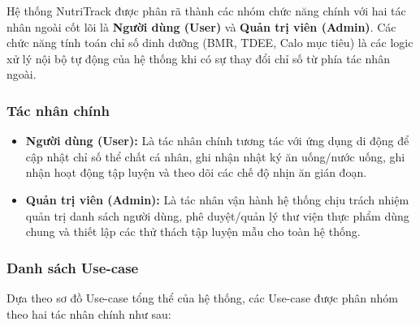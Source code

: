 \documentclass[12pt,a4paper]{article}
\begin{document}
Hệ thống NutriTrack được phân rã thành các nhóm chức năng chính với hai tác nhân ngoài cốt lõi là \textbf{Người dùng (User)} và \textbf{Quản trị viên (Admin)}. Các chức năng tính toán chỉ số dinh dưỡng (BMR, TDEE, Calo mục tiêu) là các logic xử lý nội bộ tự động của hệ thống khi có sự thay đổi chỉ số từ phía tác nhân ngoài.

\subsubsection{Tác nhân chính}

\begin{itemize}
    \item \textbf{Người dùng (User):} Là tác nhân chính tương tác với ứng dụng di động để cập nhật chỉ số thể chất cá nhân, ghi nhận nhật ký ăn uống/nước uống, ghi nhận hoạt động tập luyện và theo dõi các chế độ nhịn ăn gián đoạn.
    \item \textbf{Quản trị viên (Admin):} Là tác nhân vận hành hệ thống chịu trách nhiệm quản trị danh sách người dùng, phê duyệt/quản lý thư viện thực phẩm dùng chung và thiết lập các thử thách tập luyện mẫu cho toàn hệ thống.
\end{itemize}

\subsubsection{Danh sách Use-case}

Dựa theo sơ đồ Use-case tổng thể của hệ thống, các Use-case được phân nhóm theo hai tác nhân chính như sau:
\end{document}
